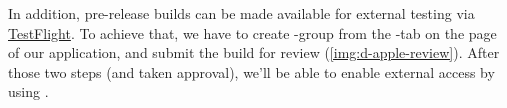 
\noindent In addition, pre-release builds can be made available for external testing via 
\href{https://testflight.apple.com/a}{TestFlight}. To achieve that, we have to create -group from 
the -tab on the page of our application, and submit the build for review (\cref{img:d-apple-review}).
After those two steps (and taken approval), we'll be able to enable external access by using .

